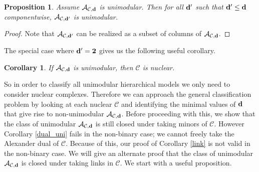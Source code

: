 \documentclass[letterpaper,12pt]{amsart}
\theoremstyle{plain}
\newtheorem{prop}[thm]{Proposition}
\newtheorem{cor}[thm]{Corollary}
\theoremstyle{definition}
\theoremstyle{remark}
\begin{document}
\begin{prop}\label{conformal}
	Assume $\mathcal{A}_{\mathcal{C},{\bf d}}$ is unimodular.
	Then for all ${\bf d}'$ such that ${\bf d}' \le {\bf d}$ componentwise,
	$\mathcal{A}_{\mathcal{C},{\bf d}'}$ is unimodular.
\end{prop}
\begin{proof}
	Note that $\mathcal{A}_{\mathcal{C},{\bf d}'}$ can be realized as a subset of columns of $\mathcal{A}_{\mathcal{C},{\bf d}}$.
\end{proof}

The special case where ${\bf d'} = {\bf 2}$ gives us the following useful corollary.

\begin{cor}\label{nuclearnonbinary}
	If $\mathcal{A}_{\mathcal{C},{\bf d}}$ is unimodular, then $\mathcal{C}$ is nuclear.
\end{cor}

So in order to classify all unimodular hierarchical models we only need to consider nuclear complexes.
Therefore we can approach the general classification problem by looking at each nuclear $\mathcal{C}$
and identifying the minimal values of ${\bf d}$ that
give rise to non-unimodular $\mathcal{A}_{\mathcal{C},{\bf d}}$.
Before proceeding with this,
we show that the class of unimodular $\mathcal{A}_{\mathcal{C},{\bf d}}$ is still closed under taking minors of $\mathcal{C}$.
However Corollary \ref{dual_uni} fails in the non-binary case; we cannot freely take the Alexander dual of $\mathcal{C}$.
Because of this, our proof of Corollary \ref{link} is not valid in the non-binary case.
We will give an alternate proof that the class of unimodular $\mathcal{A}_{\mathcal{C},{\bf d}}$ is closed under
taking links in $\mathcal{C}$.
We start with a useful proposition.
\end{document}
